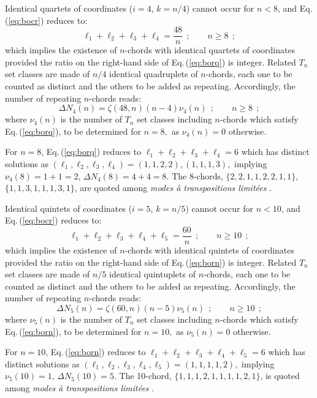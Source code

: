 \documentclass[12pt,a4paper]{article}
\begin{document}
Identical quartets of coordinates ($i=4$, $k=n/4$) cannot occur for $n<8$, and
Eq.\,(\ref{eq:bocr}) reduces to:
\begin{equation}
\label{eq:borq}
\ell_1+\ell_2+\ell_3+\ell_4=\frac{48}n~~;\qquad n\ge8~~;
\end{equation}
which implies the existence of $n$-chords with identical quartets of
coordinates
provided the ratio on the right-hand side of Eq.\,(\ref{eq:borq}) is integer.
Related $T_n$ set classes are made of $n/4$ identical quadruplets of 
$n$-chords, each one to be counted as
distinct and the others to be added as repeating.   Accordingly,
the number of repeating $n$-chords reads:
\begin{equation}
\label{eq:DeN4}
\Delta N_4(n)=\zeta(48,n)(n-4)\nu_4(n)~~;\qquad n\ge8~~;
\end{equation}
where $\nu_4(n)$ is the number of $T_n$ set classes including $n$-chords which
satisfy Eq.\,(\ref{eq:borq}), to be determined for $n=8,$ as $\nu_4(n)=0$
otherwise.

For $n=8$, Eq.\,(\ref{eq:borq}) reduces to $\ell_1+\ell_2+\ell_3+\ell_4=6$
which has
distinct solutions as $(\ell_1,\ell_2,\ell_3,\ell_4)=(1,1,2,2),(1,1,1,3),$
implying $\nu_4(8)=1+1=2$, $\Delta N_4(8)=4+4=8$.
The 8-chords, $\{2,2,1,1,2,2,1,1\}$, $\{1,1,3,1,1,1,3,1\}$, are quoted among
{\it modes \`a transpositions limit\'ees} \cite{Mes44}.

Identical quintets of coordinates ($i=5$, $k=n/5$) cannot occur for $n<10$,
and Eq.\,(\ref{eq:bocr}) reduces to:
\begin{equation}
\label{eq:born}
\ell_1+\ell_2+\ell_3+\ell_4+\ell_5=\frac{60}n~~;\qquad n\ge10~~;
\end{equation}
which implies the existence of $n$-chords with identical quintets of coordinates
provided the ratio on the right-hand side of Eq.\,(\ref{eq:born}) is integer.
Related $T_n$ set classes are made of $n/5$ identical quintuplets of
$n$-chords, each one to be counted as
distinct and the others to be added as repeating.   Accordingly,
the number of repeating $n$-chords reads:
\begin{equation}
\label{eq:DeN5}
\Delta N_5(n)=\zeta(60,n)(n-5)\nu_5(n)~~;\qquad n\ge10~~;
\end{equation}
where $\nu_5(n)$ is the number of $T_n$ set classes including $n$-chords which
satisfy Eq.\,(\ref{eq:born}), to be determined for $n=10,$ as $\nu_5(n)=0$
otherwise.

For $n=10$, Eq.\,(\ref{eq:born}) reduces to
$\ell_1+\ell_2+\ell_3+\ell_4+\ell_5=6$
which has distinct solutions as
$(\ell_1,\ell_2,\ell_3,\ell_4,\ell_5)=(1,1,1,1,2),$
implying $\nu_5(10)=1$, $\Delta N_5(10)=5$.
The 10-chord, $\{1,1,1,2,1,1,1,1,2,1\}$, is quoted among {\it modes \`a
transpositions limit\'ees} \cite{Mes44}.
\end{document}
